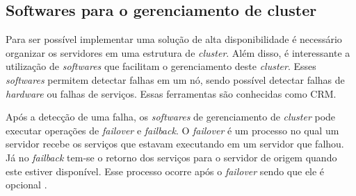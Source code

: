 




\subsection{Softwares para o gerenciamento de cluster}
\label{section:toolcluster}

Para ser possível implementar uma solução de alta disponibilidade é necessário organizar os servidores em uma estrutura de \textit{cluster}.
Além disso, é interessante a utilização de \textit{softwares} que facilitam o gerenciamento deste \textit{cluster}. Esses \textit{softwares} 
permitem detectar falhas em um nó, sendo possível detectar falhas de \textit{hardware} ou falhas de serviços. 
Essas ferramentas são conhecidas como \ac{CRM}. 

Após a detecção de uma falha, os \textit{softwares} de gerenciamento de \textit{cluster} pode executar operações de \textit{failover} e 
\textit{failback}. O \textit{failover} é um processo no qual um servidor recebe os serviços que estavam executando em um servidor que falhou. 
Já no \textit{failback} tem-se o retorno dos serviços para o servidor de origem quando este estiver disponível. Esse processo ocorre após o 
\textit{failover} sendo que ele é opcional \cite{bassan2008}.

